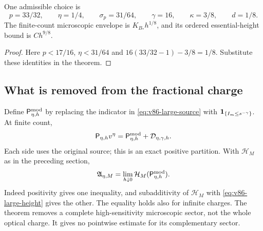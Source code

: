\begin{corollary}\label{cor:v86-explicit}
One admissible choice is
\[
 p=33/32,\qquad\eta=1/4,\qquad\sigma_p=31/64,\qquad
 \gamma=16,\qquad\kappa=3/8,\qquad d=1/8.
\]
The finite-count microscopic envelope is $K_{B_*}h^{1/8}$, and
its ordered essential-height bound is $Ch^{9/8}$.
\end{corollary}
\begin{proof}
Here $p<17/16$, $\eta<31/64$ and
$16(33/32-1)-3/8=1/8$. Substitute these identities in the theorem.
\end{proof}

\subsection{What is removed from the fractional charge}
Define $\mathsf P_{\eta,h}^{\rm mod}$ by replacing the indicator
in \eqref{eq:v86-large-source} with
$\mathbf1_{\{I_m\le s^{-\gamma}\}}$. At finite count,
\[
 \mathsf P_{\eta,h}v^\eta
       =\mathsf P_{\eta,h}^{\rm mod}+\mathcal D_{\eta,\gamma,h}.
\]
Each side uses the original source; this is an exact positive
partition. With $\mathcal H_M$ as in the preceding section,
\begin{equation}\label{eq:v86-canonical-localization}
 \mathfrak A_{\eta,M}
   =\lim_{h\downarrow0}\mathcal H_M(\mathsf P_{\eta,h}^{\rm mod}).
\end{equation}
Indeed positivity gives one inequality, and subadditivity of
$\mathcal H_M$ with \eqref{eq:v86-large-height} gives the other.
The equality holds also for infinite charges. The theorem removes a
complete high-sensitivity microscopic sector, not the whole optical
charge. It gives no pointwise estimate for its complementary sector.

